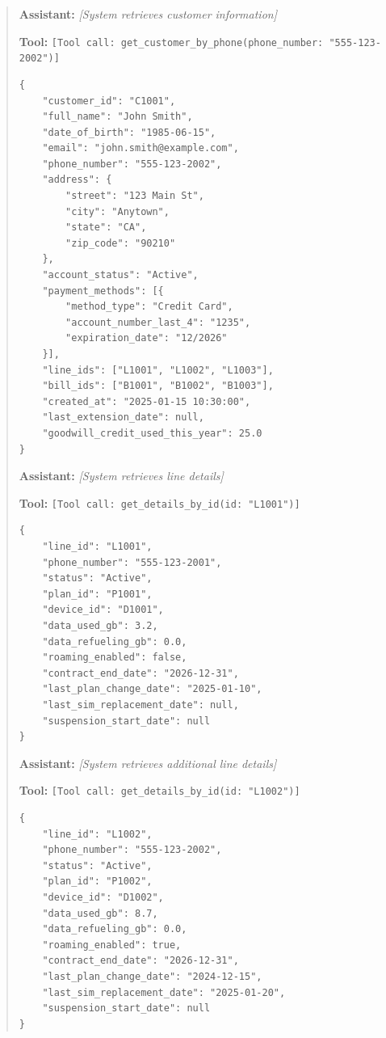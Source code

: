 \begin{quote}
\noindent\textbf{Assistant:} \textit{[System retrieves customer information]}

\vspace{0.5em}
\noindent\textbf{Tool:} \texttt{[Tool call: get\_customer\_by\_phone(phone\_number: "555-123-2002")]}

\begin{verbatim}
{
    "customer_id": "C1001",
    "full_name": "John Smith",
    "date_of_birth": "1985-06-15",
    "email": "john.smith@example.com",
    "phone_number": "555-123-2002",
    "address": {
        "street": "123 Main St",
        "city": "Anytown",
        "state": "CA",
        "zip_code": "90210"
    },
    "account_status": "Active",
    "payment_methods": [{
        "method_type": "Credit Card",
        "account_number_last_4": "1235",
        "expiration_date": "12/2026"
    }],
    "line_ids": ["L1001", "L1002", "L1003"],
    "bill_ids": ["B1001", "B1002", "B1003"],
    "created_at": "2025-01-15 10:30:00",
    "last_extension_date": null,
    "goodwill_credit_used_this_year": 25.0
}
\end{verbatim}

\vspace{0.5em}
\noindent\textbf{Assistant:} \textit{[System retrieves line details]}

\vspace{0.5em}
\noindent\textbf{Tool:} \texttt{[Tool call: get\_details\_by\_id(id: "L1001")]}

\begin{verbatim}
{
    "line_id": "L1001",
    "phone_number": "555-123-2001",
    "status": "Active",
    "plan_id": "P1001",
    "device_id": "D1001",
    "data_used_gb": 3.2,
    "data_refueling_gb": 0.0,
    "roaming_enabled": false,
    "contract_end_date": "2026-12-31",
    "last_plan_change_date": "2025-01-10",
    "last_sim_replacement_date": null,
    "suspension_start_date": null
}
\end{verbatim}

\vspace{0.5em}
\noindent\textbf{Assistant:} \textit{[System retrieves additional line details]}

\vspace{0.5em}
\noindent\textbf{Tool:} \texttt{[Tool call: get\_details\_by\_id(id: "L1002")]}

\begin{verbatim}
{
    "line_id": "L1002",
    "phone_number": "555-123-2002",
    "status": "Active",
    "plan_id": "P1002",
    "device_id": "D1002",
    "data_used_gb": 8.7,
    "data_refueling_gb": 0.0,
    "roaming_enabled": true,
    "contract_end_date": "2026-12-31",
    "last_plan_change_date": "2024-12-15",
    "last_sim_replacement_date": "2025-01-20",
    "suspension_start_date": null
}
\end{verbatim}


\end{quote}
